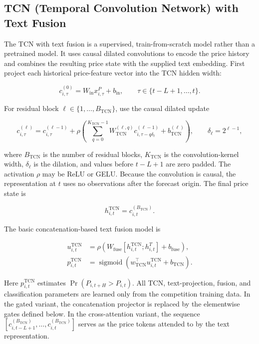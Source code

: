 \documentclass[11pt]{article}
\newcommand{\sigmoid}{\operatorname{sigmoid}}
\begin{document}
\subsection{TCN (Temporal Convolution Network) with Text Fusion}

The TCN with text fusion is a supervised, train-from-scratch model rather than
a pretrained model.  It uses causal dilated convolutions to encode the price
history and combines the resulting price state with the supplied text
embedding.  First project each historical price-feature vector into the TCN
hidden width:

\begin{equation}
c^{(0)}_{i,\tau}
=
W_{\mathrm{in}}x^P_{i,\tau}+b_{\mathrm{in}},
\qquad
\tau\in\{t-L+1,\ldots,t\}.
\end{equation}

For residual block $\ell\in\{1,\ldots,B_{\mathrm{TCN}}\}$, use the causal
dilated update

\begin{equation}
c^{(\ell)}_{i,\tau}
=
c^{(\ell-1)}_{i,\tau}
+
\rho\left(
\sum_{q=0}^{K_{\mathrm{TCN}}-1}
W^{(\ell,q)}_{\mathrm{TCN}}
c^{(\ell-1)}_{i,\tau-q\delta_\ell}
+b^{(\ell)}_{\mathrm{TCN}}
\right),
\qquad
\delta_\ell=2^{\ell-1},
\end{equation}

where $B_{\mathrm{TCN}}$ is the number of residual blocks,
$K_{\mathrm{TCN}}$ is the convolution-kernel width, $\delta_\ell$ is the
dilation, and values before $t-L+1$ are zero padded.  The activation $\rho$
may be ReLU or GELU.  Because the convolution is causal, the representation at
$t$ uses no observations after the forecast origin.  The final price state is

\begin{equation}
h^{\mathrm{TCN}}_{i,t}
=
c^{(B_{\mathrm{TCN}})}_{i,t}.
\end{equation}

The basic concatenation-based text fusion model is

\begin{align}
u^{\mathrm{TCN}}_{i,t}
&=
\rho\left(
W_{\mathrm{fuse}}
\left[
h^{\mathrm{TCN}}_{i,t};h^T_{i,t}
\right]
+b_{\mathrm{fuse}}
\right),\\
p^{\mathrm{TCN}}_{i,t}
&=
\sigmoid\left(
w_{\mathrm{TCN}}^\top u^{\mathrm{TCN}}_{i,t}
+b_{\mathrm{TCN}}
\right).
\label{simple_concatination}
\end{align}

Here $p^{\mathrm{TCN}}_{i,t}$ estimates
$\Pr(P_{i,t+H}>P_{i,t})$.  All TCN, text-projection, fusion, and classification
parameters are learned only from the competition training data.  In the gated
variant, the concatenation projector is replaced by the elementwise gates
defined below.  In the cross-attention variant, the sequence
$[c^{(B_{\mathrm{TCN}})}_{i,t-L+1},\ldots,
c^{(B_{\mathrm{TCN}})}_{i,t}]$ serves as the price tokens attended to by the
text representation.
\end{document}
